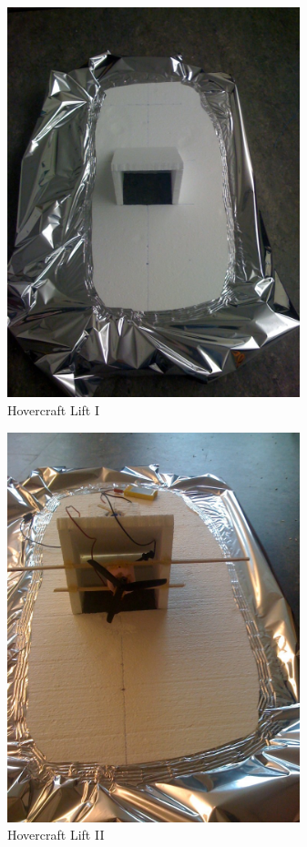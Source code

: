 \begin{figure}[h]
  \begin{center}
    \includegraphics[width=85mm]{imageSources/lift1.png}
  \end{center}
  \caption{Hovercraft Lift I} 
  \label{lif1}
\end{figure}

\begin{figure}[h]
  \begin{center}
    \includegraphics[width=85mm]{imageSources/lift2.png}
  \end{center}
  \caption{Hovercraft Lift II} 
  \label{lift2}
\end{figure}

